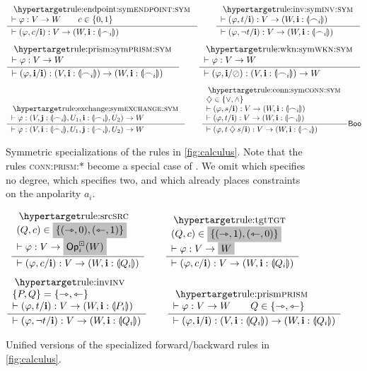 \documentclass[a4paper]{memoir}
\begin{document}
\begin{figure}[htb]
	\[
		\inferencel{endpoint:sym}{
			\sez \vfi : V \to W
			\qquad
			c \in \accol{0, 1}
		}{
			\sez (\vfi, c/\dm i) : V \to (W, \dm i : \rival{\edge_i})
		}{}
		\qquad
		\inferencel{inv:sym}{
			\sez (\vfi, t/\dm i) : V \to (W, \dm i : \rival{\edge_i})
		}{
			\sez (\vfi, \lnot t/\dm i) : V \to (W, \dm i : \rival{\edge_i})
		}{}
	\]
	\[
		\inferencel{prism:sym}{
			\sez \vfi : V \to W
		}{
			\sez (\vfi, \dm i / \dm i) : (V, \dm i : \rival{\edge_i}) \to (W, \dm i : \rival{\edge_i})
		}{}
		\qquad
		\inferencel{wkn:sym}{
			\sez \vfi : V \to W
		}{
			\sez (\vfi, \dm i / \novar) : (V, \dm i : \rival{\edge_i}) \to W
		}{}
	\]
	\[
		\inferencel{exchange:sym}{
			\sez \vfi : (V, \dm j : \rival{\edge_i}, U_1, \dm i : \rival{\edge_i}, U_2) \to W
		}{
			\sez \vfi : (V, \dm i : \rival{\edge_i}, U_1, \dm j : \rival{\edge_i}, U_2) \to W
		}{}
		\qquad
		\inferencel{conn:sym}{
			\opA \in \accol{{\vee}, {\wedge}} \\
			\sez (\vfi, s / \dm i) : V \to (W, \dm i : \rival{\edge_i}) \\
			\sez (\vfi, t / \dm i) : V \to (W, \dm i : \rival{\edge_i})
		}{
			\sez (\vfi, t \opA s / \dm i) : V \to (W, \dm i : \rival{\edge_i})
		}{$\booleanalg$}
	\]
	\caption{Symmetric specializations of the rules in \cref{fig:calculus}. Note that the rules \textsc{conn:prism:}$*$ become a special case of . We omit  which specifies no degree,  which specifies two, and which already places constraints on the anpolarity $a_i$.}
	\label{fig:calculus:sym}
\end{figure}
\begin{figure}[htb]
	\[
		\inferencel{src}{
			(Q, c) \in \mathemph{\accol{(\jet, 0), (\tej, 1)}} \\
			\sez \vfi : V \to \mathemph{\Opcube_i(W)}
		}{
			\sez (\vfi, c/\dm i) : V \to (W, \dm i : \rival{Q_i})
		}{}
		\qquad
		\inferencel{tgt}{
			(Q, c) \in \mathemph{\accol{(\jet, 1), (\tej, 0)}} \\
			\sez \vfi : V \to \mathemph{W}
		}{
			\sez (\vfi, c/\dm i) : V \to (W, \dm i : \rival{Q_i})
		}{}
	\]
	\[
		\inferencel{inv}{
			\accol{P, Q} = \accol{\jet, \tej} \\
			\sez (\vfi, t/\dm i) : V \to (W, \dm i : \rival{P_i})
		}{
			\sez (\vfi, \lnot t/\dm i) : V \to (W, \dm i : \rival{Q_i})
		}{}
		\qquad
		\inferencel{prism}{
			\sez \vfi : V \to W
			\qquad
			Q \in \accol{\jet, \tej}
		}{
			\sez (\vfi, \dm i / \dm i) : (V, \dm i : \rival{Q_i}) \to (W, \dm i : \rival{Q_i})
		}{}
	\]
	\caption{Unified versions of the specialized forward/backward rules in \cref{fig:calculus}.}
	\label{fig:calculus:general}
\end{figure}
\end{document}
